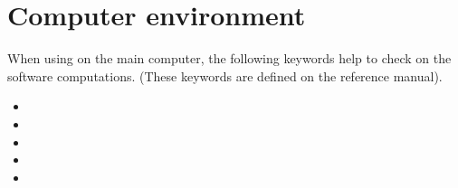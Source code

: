 \section{Computer environment}
When using \stbtel on the main computer, the following keywords help to check
on the software computations. (These keywords are defined on the reference
manual).
\begin{itemize}
\item {}
\item {}
\item {}
\item {}
\item {}
\end{itemize}
